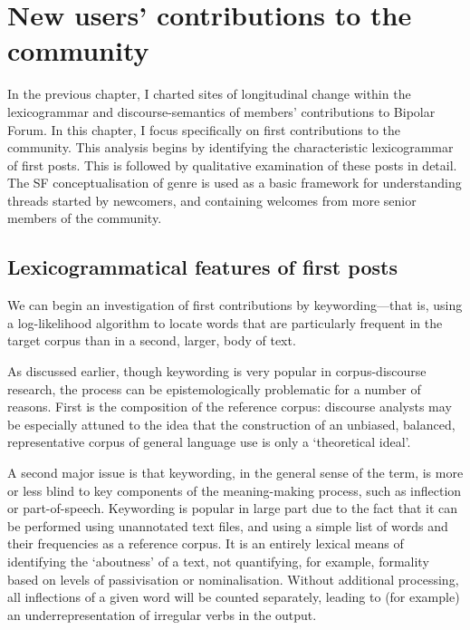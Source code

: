 
\chapter{New users' contributions to the community}

In the previous chapter, I charted sites of longitudinal change within the lexicogrammar and discourse-semantics of members' contributions to Bipolar Forum. In this chapter, I focus specifically on first contributions to the community. This analysis begins by identifying the characteristic lexicogrammar of first posts. This is followed by qualitative examination of these posts in detail. The SF conceptualisation of genre is used as a basic framework for understanding threads started by newcomers, and containing welcomes from more senior members of the community.

\section{Lexicogrammatical features of first posts}

We can begin an investigation of first contributions by keywording---that is, using a log-likelihood algorithm to locate words that are particularly frequent in the target corpus than in a second, larger, body of text.

As discussed earlier, though keywording is very popular in corpus-discourse research, the process can be epistemologically problematic for a number of reasons. First is the composition of the reference corpus: discourse analysts may be especially attuned to the idea that the construction of an unbiased, balanced, representative corpus of general language use is only a `theoretical ideal'. 

A second major issue is that keywording, in the general sense of the term, is more or less blind to key components of the meaning-making process, such as inflection or part-of-speech. Keywording is popular in large part due to the fact that it can be performed using unannotated text files, and using a simple list of words and their frequencies as a reference corpus. It is an entirely lexical means of identifying the `aboutness' of a text, not quantifying, for example, formality based on levels of passivisation or nominalisation. Without additional processing, all inflections of a given word will be counted separately, leading to (for example) an underrepresentation of irregular verbs in the output.

